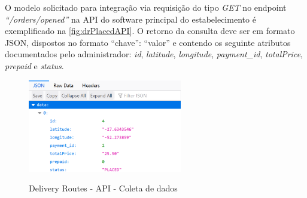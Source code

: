 O modelo solicitado para integração via requisição do tipo \textit{GET} no endpoint \textit{“/orders/opened”} na API do software principal do estabelecimento é exemplificado na \autoref{fig:drPlacedAPI}. O retorno da consulta deve ser em formato JSON, dispostos no formato “chave”: “valor” e contendo os seguinte atributos documentados pelo administrador: \textit{id}, \textit{latitude}, \textit{longitude}, \textit{payment\_id}, \textit{totalPrice}, \textit{prepaid} e \textit{status}.

\begin{figure}[H]
    \centering
    \caption{Delivery Routes - API - Coleta de dados}
    \includegraphics[width=0.6\textwidth]{./dados/figuras/fig14}
    \label{fig:drPlacedAPI}
\end{figure}
